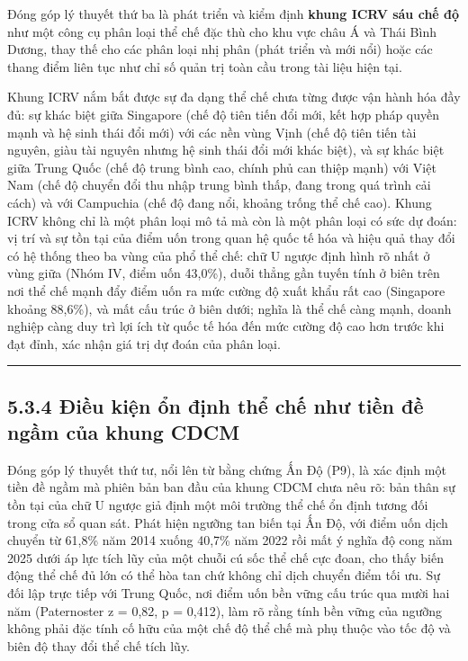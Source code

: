 \documentclass[
  a4paper,
  13pt]{extreport}
\begin{document}
Đóng góp lý thuyết thứ ba là phát triển và kiểm định \textbf{khung ICRV
sáu chế độ} như một công cụ phân loại thể chế đặc thù cho khu vực châu Á
và Thái Bình Dương, thay thế cho các phân loại nhị phân (phát triển và
mới nổi) hoặc các thang điểm liên tục như chỉ số quản trị toàn cầu trong
tài liệu hiện tại.

Khung ICRV nắm bắt được sự đa dạng thể chế chưa từng được vận hành hóa
đầy đủ: sự khác biệt giữa Singapore (chế độ tiên tiến đổi mới, kết hợp
pháp quyền mạnh và hệ sinh thái đổi mới) với các nền vùng Vịnh (chế độ
tiên tiến tài nguyên, giàu tài nguyên nhưng hệ sinh thái đổi mới khác
biệt), và sự khác biệt giữa Trung Quốc (chế độ trung bình cao, chính phủ
can thiệp mạnh) với Việt Nam (chế độ chuyển đổi thu nhập trung bình
thấp, đang trong quá trình cải cách) và với Campuchia (chế độ đang nổi,
khoảng trống thể chế cao). Khung ICRV không chỉ là một phân loại mô tả
mà còn là một phân loại có sức dự đoán: vị trí và sự tồn tại của điểm
uốn trong quan hệ quốc tế hóa và hiệu quả thay đổi có hệ thống theo ba
vùng của phổ thể chế: chữ U ngược định hình rõ nhất ở vùng giữa (Nhóm
IV, điểm uốn 43,0\%), duỗi thẳng gần tuyến tính ở biên trên nơi thể chế
mạnh đẩy điểm uốn ra mức cường độ xuất khẩu rất cao (Singapore khoảng
88,6\%), và mất cấu trúc ở biên dưới; nghĩa là thể chế càng mạnh, doanh
nghiệp càng duy trì lợi ích từ quốc tế hóa đến mức cường độ cao hơn
trước khi đạt đỉnh, xác nhận giá trị dự đoán của phân loại.

\begin{center}\rule{0.5\linewidth}{0.5pt}\end{center}

\hypertarget{ux111iux1ec1u-kiux1ec7n-ux1ed5n-ux111ux1ecbnh-thux1ec3-chux1ebf-nhux1b0-tiux1ec1n-ux111ux1ec1-ngux1ea7m-cux1ee7a-khung-cdcm}{%
\subsection{5.3.4 Điều kiện ổn định thể chế như tiền đề ngầm của khung
CDCM}\label{ux111iux1ec1u-kiux1ec7n-ux1ed5n-ux111ux1ecbnh-thux1ec3-chux1ebf-nhux1b0-tiux1ec1n-ux111ux1ec1-ngux1ea7m-cux1ee7a-khung-cdcm}}

Đóng góp lý thuyết thứ tư, nổi lên từ bằng chứng Ấn Độ (P9), là xác định
một tiền đề ngầm mà phiên bản ban đầu của khung CDCM chưa nêu rõ: bản
thân sự tồn tại của chữ U ngược giả định một môi trường thể chế ổn định
tương đối trong cửa sổ quan sát. Phát hiện ngưỡng tan biến tại Ấn Độ,
với điểm uốn dịch chuyển từ 61,8\% năm 2014 xuống 40,7\% năm 2022 rồi
mất ý nghĩa độ cong năm 2025 dưới áp lực tích lũy của một chuỗi cú sốc
thể chế cực đoan, cho thấy biến động thể chế đủ lớn có thể hòa tan chứ
không chỉ dịch chuyển điểm tối ưu. Sự đối lập trực tiếp với Trung Quốc,
nơi điểm uốn bền vững cấu trúc qua mười hai năm (Paternoster z = 0,82, p
= 0,412), làm rõ rằng tính bền vững của ngưỡng không phải đặc tính cố
hữu của một chế độ thể chế mà phụ thuộc vào tốc độ và biên độ thay đổi
thể chế tích lũy.
\end{document}
